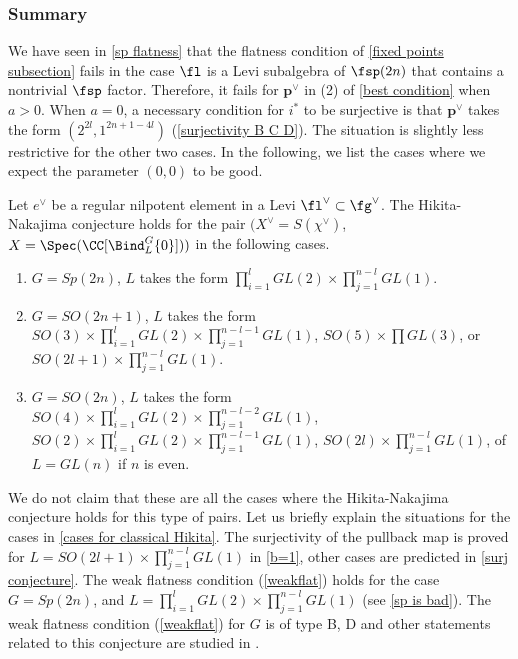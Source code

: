 \documentclass[12pt]{amsart}
\begin{document}
\subsubsection{Summary}
We have seen in \cref{sp flatness} that the flatness condition of \cref{fixed points subsection} fails in the case $\fl$ is a Levi subalgebra of $\fsp({2n})$ that contains a nontrivial $\fsp$ factor. Therefore, it fails for $\mathbf{p}^\vee$ in (2) of \cref{best condition} when $a>0$. When $a=0$, a necessary condition for $i^*$ to be surjective is that $\mathbf{p}^\vee$ takes the form $(2^{2l},1^{2n+1-4l})$ (\cref{surjectivity B C D}). The situation is slightly less restrictive for the other two cases. In the following, we list the cases where we expect the parameter $(0,0)$ to be good.
\begin{conj} \label{cases for classical Hikita}
    Let $e^\vee$ be a regular nilpotent element in a Levi $\fl^\vee\subset \fg^\vee$. The Hikita-Nakajima conjecture holds for the pair $(X^\vee= S(\chi^\vee)$, $X= \Spec(\CC[\Bind_{L}^{G}\{0\}]))$ in the following cases. 
    \begin{enumerate}
        \item $G= Sp(2n)$, $L$ takes the form $\prod_{i=1}^{l} GL({2})\times \prod_{j=1}^{n-l} GL({1})$.
        \item $G= SO(2n+1)$, $L$ takes the form $SO(3)\times \prod_{i=1}^{l} GL({2})\times \prod_{j=1}^{n-l-1} GL({1})$, $SO(5)\times \prod GL(3)$, or $SO(2l+1)\times \prod_{j=1}^{n-l} GL({1})$.
        \item $G= SO(2n)$, $L$ takes the form $SO(4)\times \prod_{i=1}^{l} GL({2})\times \prod_{j=1}^{n-l-2} GL({1})$, $SO(2)\times \prod_{i=1}^{l} GL({2})\times \prod_{j=1}^{n-l-1} GL({1})$, $SO(2l)\times \prod_{j=1}^{n-l} GL({1})$, of $L= GL(n)$ if $n$ is even.
    \end{enumerate}
\end{conj}
We do not claim that these are all the cases where the Hikita-Nakajima conjecture holds for this type of pairs. Let us briefly explain the situations for the cases in \cref{cases for classical Hikita}. The surjectivity of the pullback map is proved for $L= SO(2l+1)\times \prod_{j=1}^{n-l} GL(1)$ in \cref{b=1}, other cases are predicted in \cref{surj conjecture}. The weak flatness condition (\ref{weakflat}) holds for the case $G= Sp(2n)$, and $L= \prod_{i=1}^{l} GL(2)\times \prod_{j=1}^{n-l} GL(1)$ (see \cref{sp is bad}). The weak flatness condition (\ref{weakflat}) for $G$ is of type B, D and other statements related to this conjecture are studied in \cite{hoang2}.
 
\end{document}
